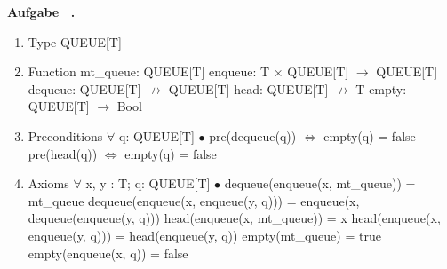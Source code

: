 \documentclass[a4paper,11pt]{article}             %
\def\vblatt{~}
\newcounter{aufgabe}
\newcommand{\Aufgabe}{\noindent\newline\addtocounter{aufgabe}{1}\textbf{Aufgabe \vblatt.\theaufgabe}\\
}
\begin{document}
\Aufgabe
\begin{enumerate}
\item Type
\subitem QUEUE[T]
\item Function
\subitem mt\_queue: QUEUE[T]
\subitem enqueue: T $\times$ QUEUE[T] $\rightarrow$ QUEUE[T]
\subitem dequeue: QUEUE[T] $\nrightarrow$ QUEUE[T]
\subitem head: QUEUE[T] $\nrightarrow$ T
\subitem empty: QUEUE[T] $\rightarrow$ Bool
\item Preconditions
\subitem $\forall$ q: QUEUE[T] $\bullet$
\subitem pre(dequeue(q)) $\Leftrightarrow$ empty(q) = false
\subitem pre(head(q)) $\Leftrightarrow$ empty(q) = false
\item Axioms
\subitem $\forall$ x, y : T; q: QUEUE[T] $\bullet$
\subitem dequeue(enqueue(x, mt\_queue)) = mt\_queue
\subitem dequeue(enqueue(x, enqueue(y, q))) = enqueue(x, dequeue(enqueue(y, q)))
\subitem head(enqueue(x, mt\_queue)) = x
\subitem head(enqueue(x, enqueue(y, q))) = head(enqueue(y, q))
\subitem empty(mt\_queue) = true
\subitem empty(enqueue(x, q)) = false
\end{enumerate}
\end{document}
